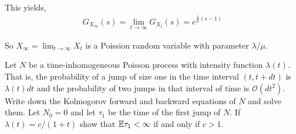 \begin{solution}[Solution]
This yields,
\begin{align*}
    G_{X_\infty}(s) = \lim_{t\to\infty} G_{X_t}(s) = e^{\frac{\lambda}{\mu}(s-1)} 
\end{align*}

So \( X_\infty = \lim_{t\to\infty} X_t \) is a Poission random variable with parameter \( \lambda/\mu \).
\end{solution}

\pagebreak
\begin{problem}[Exercise 5.4]
    Let \( N \) be a time-inhomogeneous Poisson process with intensity function \( \lambda(t) \). That is, the probability of a jump of size one in the time interval \( (t,t+ dt) \) is \( \lambda(t)dt \) and the probability of two jumps in that interval of time is \( \mathcal{O}(dt^2) \). Write down the Kolmogorov forward and backward equations of \( N \) and solve them. Let \( N_0 = 0 \) and let \( \tau_1 \) be the time of the first jump of \( N \). If \( \lambda(t) = c/(1 + t) \) show that \( \mathbb{E}\tau_1< \infty \) if and only if \( c >1 \).
\end{problem}

